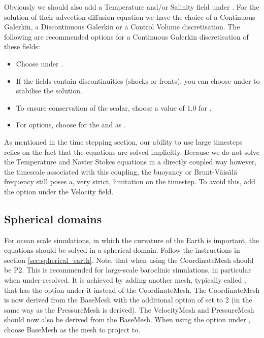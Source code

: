 Obviously we should also add a Temperature and/or Salinity field under
. For the solution of their advection-diffusion
equation we have the choice of a Continuous Galerkin, a Discontinuous Galerkin
or a Control Volume discretisation. The following are recommended options for a
Continuous Galerkin discretisation of these fields:
\begin{itemize}
  \item Choose  under
    .
  \item If the fields contain discontinuities (shocks or fronts), you can
    choose  under
     to stabilise the
    solution.
  \item To ensure conservation of the scalar, choose a value of 1.0 for
    .
  \item For  options, choose  for the
     and  as .
\end{itemize}

As mentioned in the time stepping section, our ability to use large timesteps
relies on the fact that the equations are solved implicitly. Because we do not
solve the Temperature and Navier Stokes equations in a directly coupled way
however, the timescale associated with this coupling, the buoyancy or
Brunt-V\"ais\"al\"a frequency still poses a, very strict, limitation on the timestep. To
avoid this, add the option
 under the Velocity
field.

\subsection{Spherical domains}
\label{sec:ocean_on_the_sphere}
For ocean scale simulations, in which the curvature of the Earth is important,
the equations should be solved in a spherical domain. Follow the instructions
in section \ref{sec:spherical_earth}. Note, that when using
 the CoordinateMesh should be P2. This is
recommended for large-scale baroclinic simulations, in particular when
under-resolved. It is
achieved by adding another mesh, typically called , that has the
 option under it instead of the CoordinateMesh. The
CoordinateMesh is now derived from the BaseMesh with the additional option of
 set to 2 (in the same way as the PressureMesh is
derived). The VelocityMesh and PressureMesh should now also be derived from the
BaseMesh. When using the option  under
,
choose BaseMesh as the mesh to project to.

